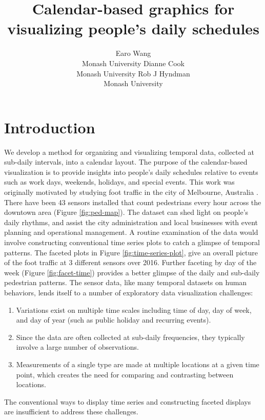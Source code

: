 \documentclass[article]{jss}
\author{
Earo Wang\\Monash University \And Dianne Cook\\Monash University \And Rob J Hyndman\\Monash University
}
\title{Calendar-based graphics for visualizing people's daily schedules}
\providecommand{\tightlist}{%
  \setlength{\itemsep}{0pt}\setlength{\parskip}{0pt}}
\theoremstyle{definition}
\theoremstyle{definition}
\theoremstyle{definition}
\theoremstyle{remark}
\begin{document}
\section{Introduction}\label{introduction}

We develop a method for organizing and visualizing temporal data,
collected at sub-daily intervals, into a calendar layout. The purpose of
the calendar-based visualization is to provide insights into people's
daily schedules relative to events such as work days, weekends,
holidays, and special events. This work was originally motivated by
studying foot traffic in the city of Melbourne, Australia \citep{ped}.
There have been 43 sensors installed that count pedestrians every hour
across the downtown area (Figure \ref{fig:ped-map}). The dataset can
shed light on people's daily rhythms, and assist the city administration
and local businesses with event planning and operational management. A
routine examination of the data would involve constructing conventional
time series plots to catch a glimpse of temporal patterns. The faceted
plots in Figure \ref{fig:time-series-plot}, give an overall picture of
the foot traffic at 3 different sensors over 2016. Further faceting by
day of the week (Figure \ref{fig:facet-time}) provides a better glimpse
of the daily and sub-daily pedestrian patterns. The sensor data, like
many temporal datasets on human behaviors, lends itself to a number of
exploratory data visualization challenges:

\begin{enumerate}
\def\labelenumi{\arabic{enumi}.}
\tightlist
\item
  Variations exist on multiple time scales including time of day, day of
  week, and day of year (such as public holiday and recurring events).
\item
  Since the data are often collected at sub-daily frequencies, they
  typically involve a large number of observations.
\item
  Measurements of a single type are made at multiple locations at a
  given time point, which creates the need for comparing and contrasting
  between locations.
\end{enumerate}

The conventional ways to display time series and constructing faceted
displays are insufficient to address these challenges.
\end{document}
